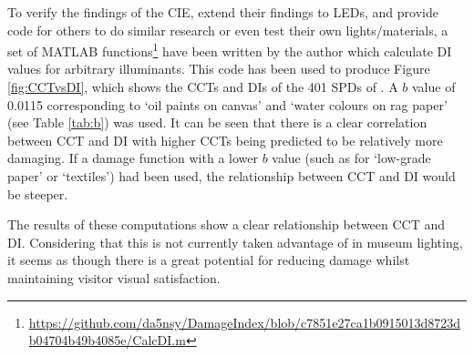 To verify the findings of the \gls{CIE}, extend their findings to \glspl{LED}, and provide code for others to do similar research or even test their own lights/materials, a set of MATLAB functions\footnote{\url{https://github.com/da5nsy/DamageIndex/blob/c7851e27ca1b0915013d8723db04704b49b4085e/CalcDI.m}} have been written by the author which calculate \gls{DI} values for arbitrary illuminants. This code has been used to produce Figure \ref{fig:CCTvsDI}, which shows the \glspl{CCT} and \glspl{DI} of the 401 \glspl{SPD} of \citet{houser_review_2013}. A $b$ value of 0.0115 corresponding to `oil paints on canvas' and `water colours on rag paper' (see Table \ref{tab:b}) was used. It can be seen that there is a clear correlation between \gls{CCT} and \gls{DI} with higher \glspl{CCT} being predicted to be relatively more damaging. If a damage function with a lower $b$ value (such as for `low-grade paper' or `textiles') had been used, the relationship between \gls{CCT} and \gls{DI} would be steeper.

%

\begin{fullpagefigure}
\figpageside{}
\caption{The \glspl{CCT} and \glspl{DI} of the \glspl{SPD} used by \citet{houser_review_2013} [provided via personal communication, but now partially (without category information) available via \gls{PTB} as `spd\_houser'].}
\label{fig:CCTvsDI}
\end{fullpagefigure}

The results of these computations show a clear relationship between \gls{CCT} and \gls{DI}. Considering that this is not currently taken advantage of in museum lighting, it seems as though there is a great potential for reducing damage whilst maintaining visitor visual satisfaction.



\cleardoublepage %


